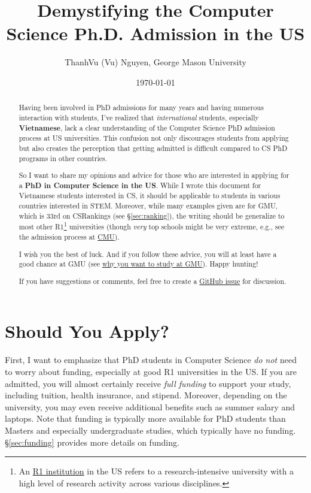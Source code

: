 \documentclass[11pt]{article}
\title{Demystifying the Computer Science Ph.D. Admission in the US}
\date{\today}
\author{ThanhVu (Vu) Nguyen, George Mason University}
\begin{document}
\maketitle

\begin{abstract}
Having been involved in PhD admissions for many years and having
numerous interaction with  students, I've
realized that \emph{international} students, especially \textbf{Vietnamese}, lack a clear understanding of
the Computer Science PhD admission process at US universities. This confusion not only
discourages students from applying but also creates the perception that
getting admitted is difficult compared to CS PhD programs in other countries.

So I want to share my opinions and advice for those who are interested in applying for a \textbf{PhD in Computer Science in the US}.
While I wrote this document for Vietnamese students interested in CS, it should be applicable to students in various countries interested in STEM.
Moreover, while many examples given are for GMU, which is 33rd on CSRankings (see \S\ref{sec:ranking}), the writing should be generalize to most other R1\footnote{An \href{https://en.wikipedia.org/wiki/List_of_research_universities_in_the_United_States}{R1 institution} in the US refers to a research-intensive university with a high level of research activity across various disciplines.} universities  (though \emph{very} top schools might be very extreme, e.g., see the admission process at \href{https://da-data.blogspot.com/2015/03/reflecting-on-cs-graduate-admissions.html}{CMU}).

I wish you the best of luck. And if you follow these advice,
you will at least have a good chance at GMU (see
\href{https://github.com/dynaroars/dynaroars.github.io/wiki/About-GMU}{why
you want to study at GMU}). Happy hunting!

If you have suggestions or comments, feel free to create a \href{https://github.com/nguyenthanhvuh/phd-cs-us/issues}{GitHub issue} for discussion.
\end{abstract}

\section{Should You Apply?}


First, I want to emphasize that PhD students in Computer
Science \emph{do not} need to worry about funding, especially at good R1
universities in the US. If you are admitted, you will almost certainly
receive \emph{full funding} to support your study, including tuition,
health insurance, and stipend. Moreover, depending on the university,
you may even receive additional benefits such as summer salary and laptops. Note that
funding is typically more available for PhD students than 
Masters and especially undergraduate studies, which typically have no funding. \S\ref{sec:funding} provides more details on funding.
\end{document}
